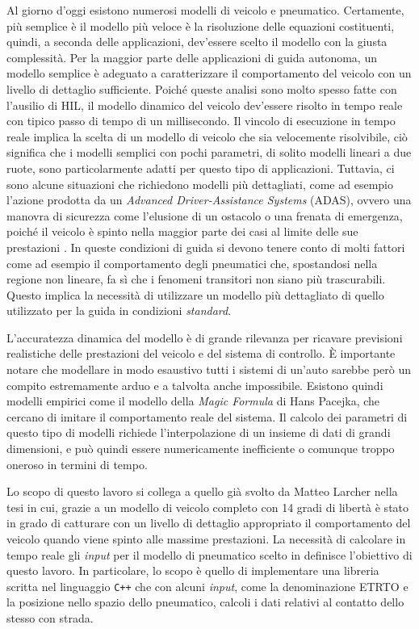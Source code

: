Al giorno d'oggi esistono numerosi modelli di veicolo e pneumatico. Certamente, più semplice è il modello più veloce è la risoluzione delle equazioni costituenti, quindi, a seconda delle applicazioni, dev'essere scelto il modello con la giusta complessità. Per la maggior parte delle applicazioni di guida autonoma, un modello semplice è adeguato a caratterizzare il comportamento del veicolo con un livello di dettaglio sufficiente. Poiché queste analisi sono molto spesso fatte con l'ausilio di \ac{HIL}, il modello dinamico del veicolo dev'essere risolto in tempo reale con tipico passo di tempo di un millisecondo. Il vincolo di esecuzione in tempo reale implica la scelta di un modello di veicolo che sia velocemente risolvibile, ciò significa che i modelli semplici con pochi parametri, di solito modelli lineari a due ruote, sono particolarmente adatti per questo tipo di applicazioni. Tuttavia, ci sono alcune situazioni che richiedono modelli più dettagliati, come ad esempio l'azione prodotta da un \textit{Advanced Driver-Assistance Systems} (ADAS), ovvero una manovra di sicurezza come l'elusione di un ostacolo o una frenata di emergenza, poiché il veicolo è spinto nella maggior parte dei casi al limite delle sue prestazioni \cite{impacts}. In queste condizioni di guida si devono tenere conto di molti fattori come ad esempio il comportamento degli pneumatici che, spostandosi nella regione non lineare, fa sì che i fenomeni transitori non siano più trascurabili. Questo implica la necessità di utilizzare un modello più dettagliato di quello utilizzato per la guida in condizioni \textit{standard}.

L'accuratezza dinamica del modello è di grande rilevanza per ricavare previsioni realistiche delle prestazioni del veicolo e del sistema di controllo. È importante notare che modellare in modo esaustivo tutti i sistemi di un'auto sarebbe però un compito estremamente arduo e a talvolta anche impossibile. Esistono quindi modelli empirici come il modello della \textit{Magic Formula} di Hans Pacejka, che cercano di imitare il comportamento reale del sistema. Il calcolo dei parametri di questo tipo di modelli richiede l'interpolazione di un insieme di dati di grandi dimensioni, e può quindi essere numericamente inefficiente o comunque troppo oneroso in termini di tempo.

Lo scopo di questo lavoro si collega a quello già svolto da Matteo Larcher nella tesi \cite{Larcher} in cui, grazie a un modello di veicolo completo con 14 gradi di libertà è stato in grado di catturare con un livello di dettaglio appropriato il comportamento del veicolo quando viene spinto alle massime prestazioni. La necessità di calcolare in tempo reale gli \textit{input} per il modello di pneumatico scelto in \cite{Larcher} definisce l'obiettivo di questo lavoro. In particolare, lo scopo è quello di implementare una libreria scritta nel linguaggio \texttt{C++} che con alcuni \textit{input}, come la denominazione \ac{ETRTO} e la posizione nello spazio dello pneumatico, calcoli i dati relativi al contatto dello stesso con strada.